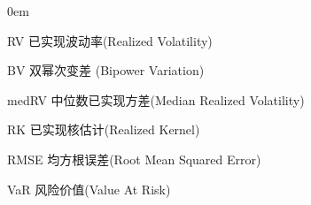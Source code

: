 \begin{denotation}
\itemsep 0em


\item [RV] 已实现波动率(Realized Volatility)  
\item [BV] 双幂次变差 (Bipower Variation) 
\item [medRV] 中位数已实现方差(Median Realized Volatility)
\item [RK] 已实现核估计(Realized Kernel)
\item [RMSE] 均方根误差(Root Mean Squared Error)
\item [VaR] 风险价值(Value At Risk)
\end{denotation}
